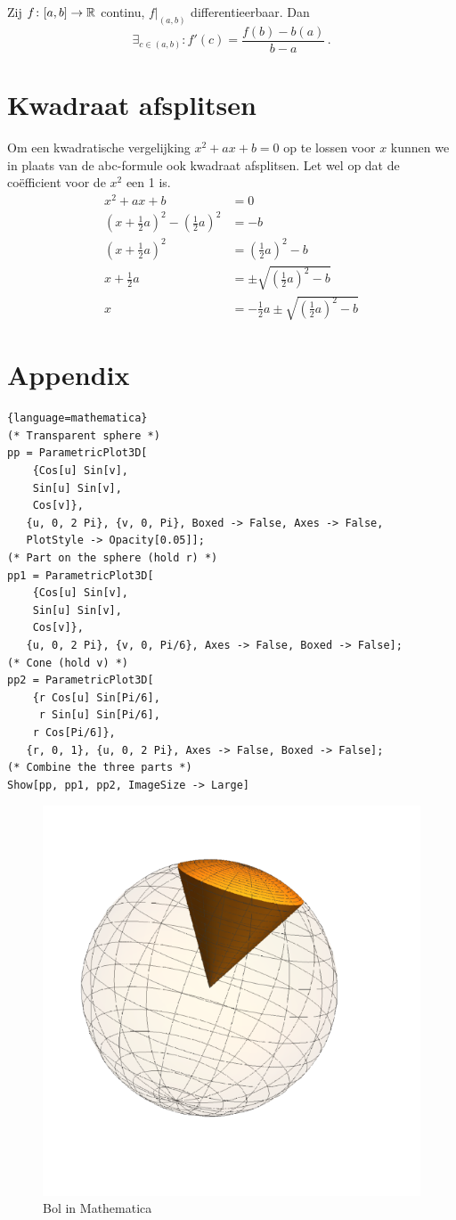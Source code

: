 \documentclass{article}
\begin{document}
    \begin{stelling}

        Zij $f\colon[a,b] \to \mathbb{R}$ continu, $f|_{(a,b)}$ differentieerbaar. Dan
        \[
        \exists_{c \in (a,b)} : f'(c) = \frac{f(b)-b(a)}{b-a}\,.
        \]
    \end{stelling}
		
	\section{Kwadraat afsplitsen}
        Om een kwadratische vergelijking $x^2 + ax + b = 0$ op te lossen voor $x$ kunnen we in plaats van de abc-formule ook kwadraat afsplitsen. Let wel op dat de co\"efficient voor de $x^2$ een 1 is.
        \begin{align*}
            x^2 + a x + b &= 0 \\
            \left(x + \frac{1}{2} a\right)^2 - \left( \frac{1}{2}a \right)^2 &= - b \\
            \left(x + \frac{1}{2} a\right)^2 &= \left( \frac{1}{2}a \right)^2 - b \\
            x + \frac{1}{2} a &= \pm \sqrt{\left( \frac{1}{2}a \right)^2 - b} \\
            x &= -  \frac{1}{2} a \pm \sqrt{\left(\frac{1}{2}a \right)^2 - b}
        \end{align*}

    \newpage
    \section{Appendix}
    \begin{lstlisting}{language=mathematica}
(* Transparent sphere *)
pp = ParametricPlot3D[
    {Cos[u] Sin[v],
    Sin[u] Sin[v],
    Cos[v]},
   {u, 0, 2 Pi}, {v, 0, Pi}, Boxed -> False, Axes -> False,
   PlotStyle -> Opacity[0.05]];
(* Part on the sphere (hold r) *)
pp1 = ParametricPlot3D[
    {Cos[u] Sin[v],
    Sin[u] Sin[v],
    Cos[v]},
   {u, 0, 2 Pi}, {v, 0, Pi/6}, Axes -> False, Boxed -> False];
(* Cone (hold v) *)
pp2 = ParametricPlot3D[
    {r Cos[u] Sin[Pi/6],
     r Sin[u] Sin[Pi/6],
    r Cos[Pi/6]},
   {r, 0, 1}, {u, 0, 2 Pi}, Axes -> False, Boxed -> False];
(* Combine the three parts *)
Show[pp, pp1, pp2, ImageSize -> Large]
    \end{lstlisting}
    \begin{figure}[h!]
        \centering
        \includegraphics[width=.5\textwidth]{bolMMa.png}
    \caption{Bol in Mathematica}\label{bolMMa}
    \end{figure}
\end{document}
